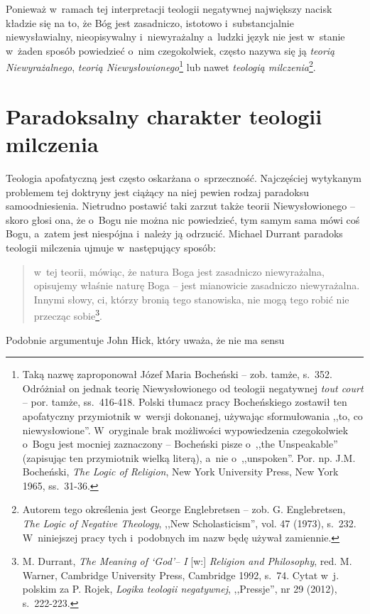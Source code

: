 Ponieważ w~ramach tej interpretacji teologii negatywnej największy nacisk kładzie się na to, że Bóg jest zasadniczo, istotowo i~substancjalnie niewysławialny, nieopisywalny i~niewyrażalny a~ludzki język nie jest w~stanie w~żaden sposób powiedzieć o~nim czegokolwiek, często nazywa się ją \textit{teorią Niewyrażalnego}, \textit{teorią Niewysłowionego}\footnote{Taką nazwę zaproponował Józef Maria Bocheński -- zob. tamże, s.~352. Odróżniał on jednak teorię Niewysłowionego od teologii negatywnej \textit{tout court} -- por. tamże, ss.~416-418. Polski tłumacz pracy Bocheńskiego zostawił ten apofatyczny przymiotnik w~wersji dokonanej, używając sformułowania ,,to, co niewysłowione''. W~oryginale brak możliwości wypowiedzenia czegokolwiek o~Bogu jest mocniej zaznaczony -- Bocheński pisze o~,,the Unspeakable'' (zapisując ten przymiotnik wielką literą), a~nie o~,,unspoken''. Por. np. J.M. Bocheński, \textit{The Logic of Religion}, New York University Press, New York 1965, ss.~31-36.} lub nawet \textit{teologią milczenia}\footnote{Autorem tego określenia jest George Englebretsen -- zob. G. Englebretsen, \textit{The Logic of Negative Theology}, ,,New Scholasticism'', vol. 47 (1973), s.~232. W~niniejszej pracy tych i~podobnych im nazw będę używał zamiennie.}.


\section{Paradoksalny charakter teologii milczenia}\label{sil-int-par}

Teologia apofatyczną jest często oskarżana o~sprzeczność. Najczęściej wytykanym problemem tej doktryny jest ciążący na niej pewien rodzaj paradoksu samoodniesienia. Nietrudno postawić taki zarzut także teorii Niewysłowionego -- skoro głosi ona, że o~Bogu nie można nic powiedzieć, tym samym sama mówi coś Bogu, a~zatem jest niespójna i~należy ją odrzucić. Michael Durrant paradoks teologii milczenia ujmuje w~następujący sposób:

\begin{quote}
w~tej teorii, mówiąc, że natura Boga jest zasadniczo niewyrażalna, opisujemy właśnie naturę Boga -- jest mianowicie zasadniczo niewyrażalna. Innymi słowy, ci, którzy bronią tego stanowiska, nie mogą tego robić nie przecząc sobie\footnote{M. Durrant, \textit{The Meaning of ‘God'– I} [w:] \textit{Religion and Philosophy}, red. M. Warner, Cambridge University Press, Cambridge 1992, s.~74. Cytat w~j. polskim za P. Rojek, \textit{Logika teologii negatywnej}, ,,Pressje'', nr 29 (2012), s.~222-223.}.

\end{quote}
Podobnie argumentuje John Hick, który uważa, że nie ma sensu

